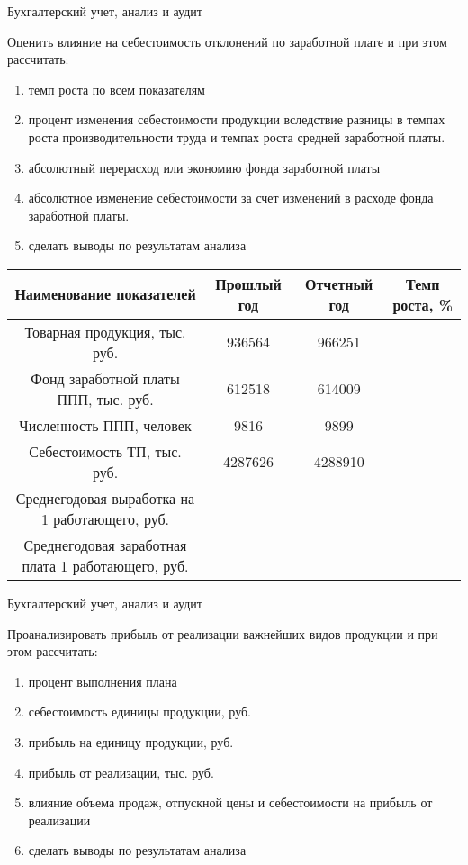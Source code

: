 \documentclass[
	11pt,
	a4paper,
	]
	{article}
\begin{document}
 {Бухгалтерский учет, анализ и аудит}
\prGE

	Оценить влияние на себестоимость отклонений по заработной плате и при этом рассчитать:

\begin{enumerate}
	\item темп роста по всем показателям
	\item процент изменения себестоимости продукции вследствие разницы в темпах роста производительности труда и темпах роста средней заработной платы.
	\item абсолютный перерасход или экономию фонда заработной платы
	\item абсолютное изменение себестоимости за счет изменений в расходе фонда заработной платы.
	\item сделать выводы по результатам анализа
\end{enumerate}

\begin{table}[ht!]\centering
\begin{tabular}{|c |c |c |c |}
\hline
Наименование показателей & Прошлый год & Отчетный год & Темп роста, \% \\ \hline
Товарная продукция, тыс. руб. & 936564 & 966251 &\\ \hline
Фонд заработной платы ППП, тыс. руб. & 612518 & 614009 & \\ \hline
Численность ППП, человек & 9816 & 9899 & \\ \hline
Себестоимость ТП, тыс. руб. & 4287626 & 4288910 & \\ \hline
Среднегодовая выработка на 1 работающего, руб. & & & \\ \hline
Среднегодовая заработная плата 1 работающего, руб. & & & \\ \hline
\end{tabular}
\end{table}

\begin{center}\lowGE * \end{center}
\newpage




 {Бухгалтерский учет, анализ и аудит}
\prGE

	Проанализировать прибыль от реализации важнейших видов продукции и при этом рассчитать:

\begin{enumerate}
	\item процент выполнения плана
	\item себестоимость единицы продукции, руб.
	\item прибыль на единицу продукции, руб.
	\item прибыль от реализации, тыс. руб.
	\item влияние объема продаж, отпускной цены и себестоимости на прибыль от реализации 
	\item сделать выводы по результатам анализа
\end{enumerate}
\end{document}
